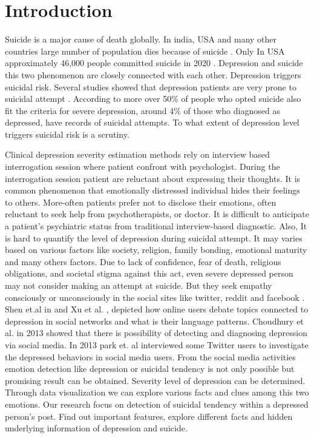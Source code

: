 \documentclass[sn-mathphys,Numbered]{sn-jnl}%
\theoremstyle{thmstyleone}%
\theoremstyle{thmstyletwo}%
\theoremstyle{thmstylethree}%
\begin{document}
\section{Introduction}\label{sec1}
Suicide is a major cause of death globally. In india, USA and many other countries large number of population dies because of suicide \cite{havigerova2019text, singh2022startling}. Only In USA approximately 46,000 people committed suicide in 2020 \cite{singh2022startling}. Depression and suicide this two phenomenon are closely connected with each other. Depression triggers suicidal risk. Several studies showed that depression patients are very prone to suicidal attempt \cite{vuorilehto2006suicidal, mcgirr2007examination, hawton2013risk}. According to \cite{singh2022startling} more over 50\% of people who opted suicide also fit the criteria for severe depression, around 4\% of those who diagnosed as depressed, have records of suicidal attempts. To what extent of depression level triggers suicidal risk is a scrutiny. 

Clinical depression severity estimation methods rely on interview based interrogation session where patient confront with psychologist. During the interrogation session patient are reluctant about expressing their thoughts. It is common phenomenon that emotionally distressed individual hides their feelings to others. More-often patients prefer not to disclose their emotions, often reluctant to seek help from psychotherapists, or doctor. It is difficult to anticipate a patient's psychiatric status from traditional interview-based diagnostic. Also, It is hard to quantify the level of depression during suicidal attempt. It may varies based on various factors like society, religion, family bonding, emotional maturity and many others factors. Due to lack of confidence, fear of death, religious obligations, and societal stigma against this act, even severe depressed person may not consider making an attempt at suicide. But they seek empathy consciously or unconsciously in the social sites like twitter, reddit and facebook \cite{chen2018}. Shen et.al in \cite{shen2017depression} and Xu et al. \cite{xu2016contribution}, depicted how online users debate topics connected to depression in social networks and what is their language patterns. Choudhury et al. in 2013 \cite{de2013predicting} showed that there is possibility of detecting and diagnosing depression via social media. In 2013 park et. al \cite{park2013perception} interviewed some Twitter users to investigate the depressed behaviors in social media users. From the social media activities emotion detection like depression or suicidal tendency is not only possible but promising result can be obtained. Severity level of depression can be determined. Through data visualization we can explore various facts and clues among this two emotions. Our research focus on detection of suicidal tendency within a depressed person’s post. Find out important features, explore different facts and hidden underlying information of depression and suicide.  
\end{document}
